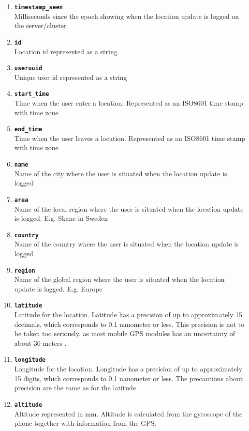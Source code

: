 \begin{enumerate}
\item \texttt{\textbf{timestamp\_seen}}\\Milliseconds since the epoch showing when the location update is logged on the server/cluster 
\item \texttt{\textbf{id}}\\Location id represented as a string  
\item \texttt{\textbf{useruuid}}\\Unique user id represented as a string 
\item \texttt{\textbf{start\_time}}\\Time when the user enter a location. Represented as an ISO8601 time stamp with time zone 
\item \texttt{\textbf{end\_time}}\\Time when the user leaves a location. Represented as an ISO8601 time stamp with time zone
\item \texttt{\textbf{name}}\\Name of the city where the user is situated when the location update is logged 
\item \texttt{\textbf{area}}\\Name of the local region where the user is situated when the location update is logged. E.g. Skane in Sweden 
\item \texttt{\textbf{country}}\\Name of the country where the user is situated when the location update is logged 
\item \texttt{\textbf{region}}\\Name of the global region where the user is situated when the location update is logged. E.g. Europe
\item \texttt{\textbf{latitude}}\\Latitude for the location. Latitude has a precision of up to approximately 15 decimals, which corresponds to 0.1 nanometer or less. This precision is not to be taken too seriously, as most mobile GPS modules has an uncertainty of about 30 meters   \cite{NAV:8292634}.  
\item \texttt{\textbf{longitude}}\\Longitude for the location. Longitude has a precision of up to approximately 15 digits, which corresponds to 0.1 nanometer or less. The precautions about precision are the same as for the latitude 
\item \texttt{\textbf{altitude}}\\Altitude represented in mm. Altitude is calculated from the gyroscope of the phone together with information from the GPS.  

\end{enumerate}
